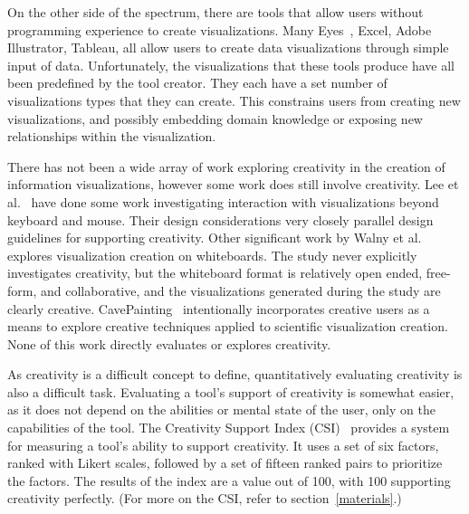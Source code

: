 On the other side of the spectrum, there are tools that allow users without programming experience to create visualizations.
Many Eyes~\cite{viegas2007manyeyes}, Excel, Adobe Illustrator, Tableau, all allow users to create data visualizations through simple input of data.
Unfortunately, the visualizations that these tools produce have all been predefined by the tool creator.
They each have a set number of visualizations types that they can create.
This constrains users from creating new visualizations, and possibly embedding domain knowledge or exposing new relationships within the visualization.

\label{creativitySupport}

There has not been a wide array of work exploring creativity in the creation of information visualizations, however some work does still involve creativity.
Lee et al.~\cite{lee2012beyond} have done some work investigating interaction with visualizations beyond keyboard and mouse.
Their design considerations very closely parallel design guidelines for supporting creativity.
Other significant work by Walny et al.~\cite{walny2011visual} explores visualization creation on whiteboards.
The study never explicitly investigates creativity, but the whiteboard format is relatively open ended, free-form, and collaborative, and the visualizations generated during the study are clearly creative.
CavePainting~\cite{Keefe-2008-SSF} intentionally incorporates creative users as a means to explore creative techniques applied to scientific visualization creation.
None of this work directly evaluates or explores creativity.

As creativity is a difficult concept to define, quantitatively evaluating creativity is also a difficult task.
Evaluating a tool's support of creativity is somewhat easier, as it does not depend on the abilities or mental state of the user, only on the capabilities of the tool.
The Creativity Support Index (CSI)~\cite{carroll2009creativity} provides a system for measuring a tool's ability to support creativity.
It uses a set of six factors, ranked with Likert scales, followed by a set of fifteen ranked pairs to prioritize the factors.
The results of the index are a value out of 100, with 100 supporting creativity perfectly.
(For more on the CSI, refer to section~\ref{materials}.)